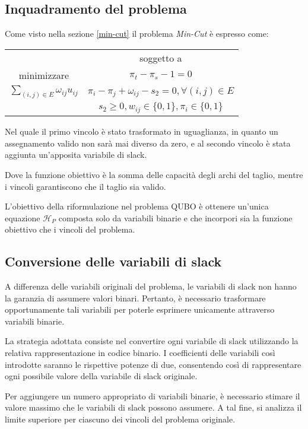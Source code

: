 \documentclass{article}
\begin{document}
\subsection{Inquadramento del problema}
Come visto nella sezione \ref{min-cut} il problema \emph{Min-Cut} è espresso come:
\begin{center}
\begin{table}[H]
    \centering
    \begin{tabular}{c|c}
        & soggetto a \\
        minimizzare & $\pi_t - \pi_s - 1 = 0$ \\
        $\sum_{(i, j) \in E} \omega_{ij}u_{ij}$ & $\pi_i - \pi_j + \omega_{ij} - s_2= 0, \forall (i, j) \in E$\\
        & $s_2 \geq 0, w_{ij} \in \{0, 1\}, \pi_i \in \{0, 1\}$
    \end{tabular}
\end{table}
\end{center}

Nel quale il primo vincolo è stato trasformato in uguaglianza, in quanto un assegnamento valido non sarà mai diverso da zero, e al secondo vincolo è stata aggiunta un'apposita variabile di slack.

Dove la funzione obiettivo è la somma delle capacità degli archi del taglio, mentre i vincoli garantiscono che il taglio sia valido.

L'obiettivo della riformulazione nel problema QUBO è ottenere un'unica equazione $\mathcal{H}_P$ composta solo da variabili binarie e che incorpori sia la funzione obiettivo che i vincoli del problema.

\subsection{Conversione delle variabili di slack}
A differenza delle variabili originali del problema, le variabili di slack non hanno la garanzia di assumere valori binari. Pertanto, è necessario trasformare opportunamente tali variabili per poterle esprimere unicamente attraverso variabili binarie.

La strategia adottata consiste nel convertire ogni variabile di slack utilizzando la relativa rappresentazione in codice binario. I coefficienti delle variabili così introdotte saranno le rispettive potenze di due, consentendo così di rappresentare ogni possibile valore della variabile di slack originale.

Per aggiungere un numero appropriato di variabili binarie, è necessario stimare il valore massimo che le variabili di slack possono assumere. A tal fine, si analizza il limite superiore per ciascuno dei vincoli del problema originale.
\end{document}
